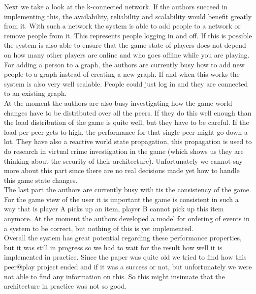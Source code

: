 \indent Next we take a look at the k-connected network. If the authors succeed in implementing this, the availability, reliability and scalability would benefit greatly from it. With such a network the system is able to add people to a network or remove people from it. This represents people logging in and off. If this is possible the system is also able to ensure that the game state of players does not depend on how many other players are online and who goes offline while you are playing. For adding a person to a graph, the authors are currently busy how to add new people to a graph instead of creating a new graph. If and when this works the system is also very well scalable. People could just log in and they are connected to an existing graph.\\
\indent At the moment the authors are also busy investigating how the game world changes have to be distributed over all the peers. If they do this well enough than the load distribution of the game is quite well, but they have to be careful. If the load per peer gets to high, the performance for that single peer might go down a lot. They have also a reactive world state propagation, this propagation is used to do research in virtual crime investigation in the game (which shows us they are thinking about the security of their architecture). Unfortunately we cannot say more about this part since there are no real decisions made yet how to handle this game state changes.\\
\indent The last part the authors are currently busy with tis the consistency of the game. For the game view of the user it is important the game is consistent in such a way that is player A picks up an item, player B cannot pick up this item anymore. At the moment the authors developed a model for ordering of events in a system to be correct, but nothing of this is yet implemented. \\
\indent Overall the system has great potential regarding these performance properties, but it was still in progress so we had to wait for the result how well it is implemented in practice. Since the paper was quite old we tried to find how this peer@play project ended and if it was a success or not, but unfortunately we were not able to find any information on this. So this might insinuate that the architecture in practice was not so good.


